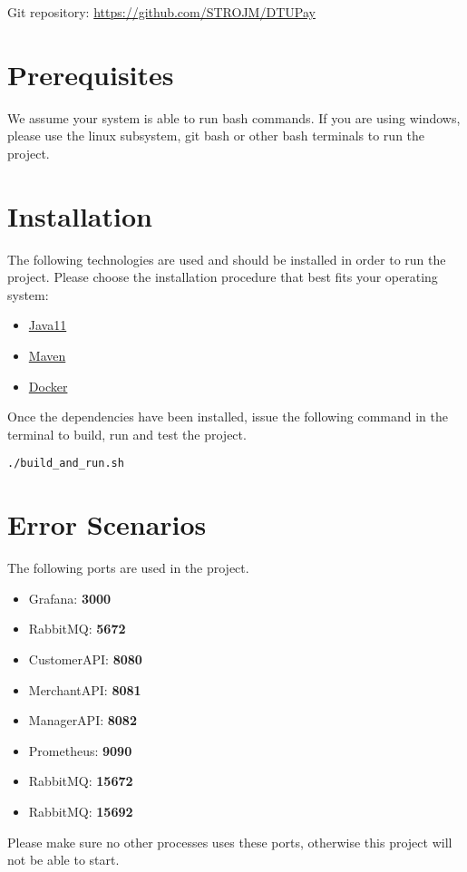 \documentclass[12pt]{article}
\newcommand{\port}[1]{\textbf{#1}}
\begin{document}
Git repository: \url{https://github.com/STROJM/DTUPay}
\section{Prerequisites}
We assume your system is able to run bash commands. If you are using windows, please use the linux subsystem, git bash or other bash terminals to run the project.


\section{Installation}
The following technologies are used and should be installed in order to run the project. Please choose the installation procedure that best fits your operating system:

\begin{itemize}
	\item{\href{https://www.oracle.com/java/technologies/downloads/#java11}{Java11}}
	\item{\href{https://maven.apache.org/install.html}{Maven}}
	\item{\href{https://docs.docker.com/get-docker/}{Docker}}
\end{itemize}

Once the dependencies have been installed, issue the following command in the terminal to build, run and test the project.

\begin{lstlisting}
./build_and_run.sh
\end{lstlisting}


\section{Error Scenarios}
The following ports are used in the project.
\begin{itemize}
	\item{Grafana: \port{3000}}
	\item{RabbitMQ: \port{5672}}
	\item{CustomerAPI: \port{8080}}
	\item{MerchantAPI: \port{8081}}
	\item{ManagerAPI: \port{8082}}
	\item{Prometheus: \port{9090}}
	\item{RabbitMQ: \port{15672}}
	\item{RabbitMQ: \port{15692}}
\end{itemize}

Please make sure no other processes uses these ports, otherwise this project will not be able to start.
\end{document}
